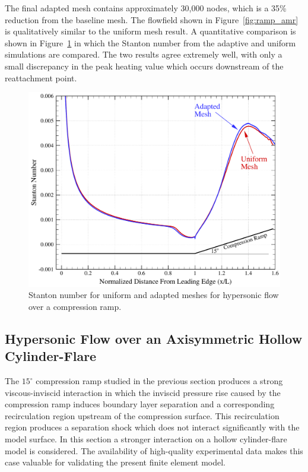 The final adapted mesh contains approximately 30,000 nodes, which is a 35\% reduction from the baseline mesh.  The flowfield shown in Figure~\ref{fig:ramp_amr} is qualitatively similar to the uniform mesh result. A quantitative comparison is shown in Figure~\ref{fig:ramp_amr_st} in which the Stanton number from the adaptive and uniform simulations are compared.  The two results agree extremely well, with only a small discrepancy in the peak heating value which occurs downstream of the reattachment point.
\begin{figure}[hbtp]
  \begin{center}
    \includegraphics[width=\textwidth]{figures/holden_ramp/amr_st_comp}
    \caption{Stanton number for uniform and adapted meshes for hypersonic flow over a compression ramp.\label{fig:ramp_amr_st}}
  \end{center}
\end{figure}

\clearpage
\subsection{Hypersonic Flow over an Axisymmetric Hollow Cylinder-Flare\label{sec:comp_ns_cylinder_flare}}

The $15^\circ$ compression ramp studied in the previous section produces a strong viscous-inviscid interaction in which the inviscid pressure rise caused by the compression ramp induces boundary layer separation and a corresponding recirculation region upstream of the compression surface.  This recirculation region produces a separation shock which does not interact significantly with the model surface.  In this section a stronger interaction on a hollow cylinder-flare model is considered. The availability of high-quality experimental data makes this case valuable for validating the present finite element model.

